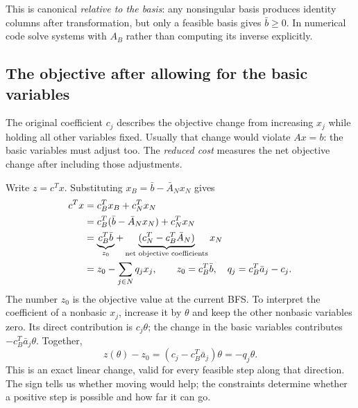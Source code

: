 \documentclass[11pt,a4paper]{article}
\begin{document}
This is canonical \emph{relative to the basis}: any nonsingular basis produces
identity columns after transformation, but only a feasible basis gives
$\bar b\geq0$. In numerical code solve systems with $A_B$ rather than computing
its inverse explicitly.

\subsection{The objective after allowing for the basic variables}
The original coefficient $c_j$ describes the objective change from increasing
$x_j$ while holding all other variables fixed. Usually that change would
violate $Ax=b$: the basic variables must adjust too. The \emph{reduced cost}
measures the net objective change after including those adjustments.

Write $z=c^Tx$. Substituting $x_B=\bar b-\bar A_Nx_N$ gives
\begin{align}
  c^Tx&=c_B^Tx_B+c_N^Tx_N\notag\\
  &=c_B^T(\bar b-\bar A_Nx_N)+c_N^Tx_N\notag\\
  &=\underbrace{c_B^T\bar b}_{z_0}
  +\underbrace{(c_N^T-c_B^T\bar A_N)}_{\text{net objective coefficients}}x_N\notag\\
  &=z_0-\sum_{j\in N}q_jx_j,\qquad
  z_0=c_B^T\bar b,\quad q_j=c_B^T\bar a_j-c_j.\label{eq:reduced}
\end{align}
The number $z_0$ is the objective value at the current BFS. To interpret the
coefficient of a nonbasic $x_j$, increase it by $\theta$ and keep the other
nonbasic variables zero. Its direct contribution is $c_j\theta$; the change
in the basic variables contributes $-c_B^T\bar a_j\theta$. Together,
\[
  z(\theta)-z_0=(c_j-c_B^T\bar a_j)\theta=-q_j\theta.
\]
This is an exact linear change, valid for every feasible step along that
direction. The sign tells us whether moving would help; the constraints
determine whether a positive step is possible and how far it can go.
\end{document}
